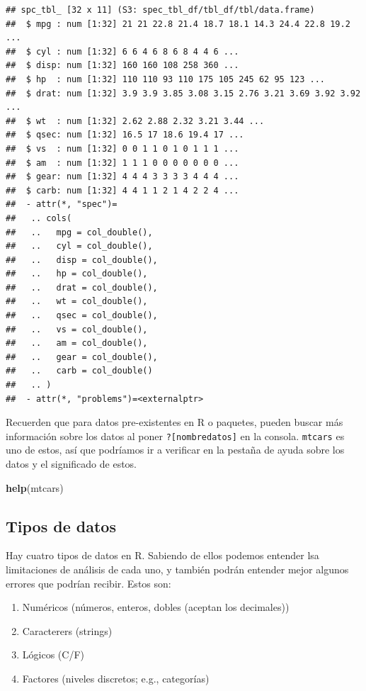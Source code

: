 \documentclass[
]{article}
\newenvironment{Shaded}{\begin{snugshade}}{\end{snugshade}}
\newcommand{\FunctionTok}[1]{\textcolor[rgb]{0.13,0.29,0.53}{\textbf{#1}}}
\newcommand{\NormalTok}[1]{#1}
\providecommand{\tightlist}{%
  \setlength{\itemsep}{0pt}\setlength{\parskip}{0pt}}
\begin{document}
\begin{verbatim}
## spc_tbl_ [32 x 11] (S3: spec_tbl_df/tbl_df/tbl/data.frame)
##  $ mpg : num [1:32] 21 21 22.8 21.4 18.7 18.1 14.3 24.4 22.8 19.2 ...
##  $ cyl : num [1:32] 6 6 4 6 8 6 8 4 4 6 ...
##  $ disp: num [1:32] 160 160 108 258 360 ...
##  $ hp  : num [1:32] 110 110 93 110 175 105 245 62 95 123 ...
##  $ drat: num [1:32] 3.9 3.9 3.85 3.08 3.15 2.76 3.21 3.69 3.92 3.92 ...
##  $ wt  : num [1:32] 2.62 2.88 2.32 3.21 3.44 ...
##  $ qsec: num [1:32] 16.5 17 18.6 19.4 17 ...
##  $ vs  : num [1:32] 0 0 1 1 0 1 0 1 1 1 ...
##  $ am  : num [1:32] 1 1 1 0 0 0 0 0 0 0 ...
##  $ gear: num [1:32] 4 4 4 3 3 3 3 4 4 4 ...
##  $ carb: num [1:32] 4 4 1 1 2 1 4 2 2 4 ...
##  - attr(*, "spec")=
##   .. cols(
##   ..   mpg = col_double(),
##   ..   cyl = col_double(),
##   ..   disp = col_double(),
##   ..   hp = col_double(),
##   ..   drat = col_double(),
##   ..   wt = col_double(),
##   ..   qsec = col_double(),
##   ..   vs = col_double(),
##   ..   am = col_double(),
##   ..   gear = col_double(),
##   ..   carb = col_double()
##   .. )
##  - attr(*, "problems")=<externalptr>
\end{verbatim}

Recuerden que para datos pre-existentes en R o paquetes, pueden buscar
más información sobre los datos al poner \texttt{?{[}nombredatos{]}} en
la consola. \texttt{mtcars} es uno de estos, así que podríamos ir a
verificar en la pestaña de ayuda sobre los datos y el significado de
estos.

\begin{Shaded}
\begin{Highlighting}[]
\FunctionTok{help}\NormalTok{(mtcars)}
\end{Highlighting}
\end{Shaded}

\subsection{Tipos de datos}\label{tipos-de-datos}

Hay cuatro tipos de datos en R. Sabiendo de ellos podemos entender lsa
limitaciones de análisis de cada uno, y también podrán entender mejor
algunos errores que podrían recibir. Estos son:

\begin{enumerate}
\def\labelenumi{\arabic{enumi}.}
\tightlist
\item
  Numéricos (números, enteros, dobles (aceptan los decimales))
\item
  Caracterers (strings)
\item
  Lógicos (C/F)
\item
  Factores (niveles discretos; e.g., categorías)
\end{enumerate}
\end{document}
